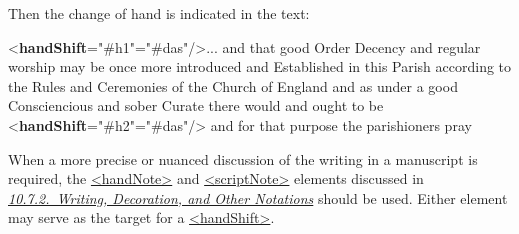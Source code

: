 Then the change of hand is indicated in the text: \par\bgroup{}\exampleFont \begin{shaded}\noindent\mbox{}{<\textbf{handShift}\hspace*{1em}{new}="{\#h1}"\hspace*{1em}{resp}="{\#das}"/>}... and that good Order Decency and regular worship may be once\mbox{}\newline 
 more introduced and Established in this Parish according to the Rules and\mbox{}\newline 
 Ceremonies of the Church of England and as under a good Consciencious and sober\mbox{}\newline 
 Curate there would and ought to be {<\textbf{handShift}\hspace*{1em}{new}="{\#h2}"\hspace*{1em}{resp}="{\#das}"/>} and for that\mbox{}\newline 
 purpose the parishioners pray\end{shaded}\egroup\par \par
When a more precise or nuanced discussion of the writing in a manuscript is required, the \hyperref[TEI.handNote]{<handNote>} and \hyperref[TEI.scriptNote]{<scriptNote>} elements discussed in \textit{\hyperref[msph2]{10.7.2.\ Writing, Decoration, and Other Notations}} should be used. Either element may serve as the target for a \hyperref[TEI.handShift]{<handShift>}.
